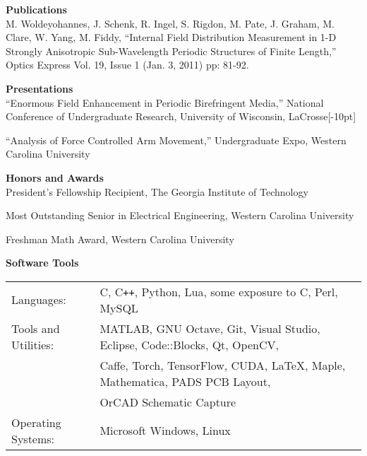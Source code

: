 \documentclass[10pt,letterpaper]{article}
\begin{document}

\bigskip
\noindent\textbf{\large{Publications}}\vspace{5.3pt}\\
\noindent
\footnotesize{M. Woldeyohannes, J. Schenk, R. Ingel, S. Rigdon, M. Pate, J. Graham, M. Clare, W. Yang, M. Fiddy, ``Internal Field Distribution Measurement in 1-D Strongly Anisotropic Sub-Wavelength Periodic Structures of Finite Length,'' Optics Express Vol. 19, Issue 1 (Jan. 3, 2011) pp: 81-92.}

\bigskip
\noindent\textbf{\large{Presentations}}\vspace{5.3pt}\\
\footnotesize{``Enormous  Field  Enhancement  in  Periodic  Birefringent Media,''
National Conference of Undergraduate Research, University of Wisconsin, LaCrosse}[-10pt]

\medskip\noindent
\footnotesize{``Analysis of Force Controlled Arm Movement,'' Undergraduate Expo, Western Carolina University}

\bigskip
\noindent\textbf{\large{Honors and Awards}}\vspace{5.3pt}\\
\noindent\footnotesize{President's Fellowship Recipient, The Georgia Institute of Technology}

\medskip
\noindent\footnotesize{Most Outstanding Senior in Electrical Engineering, Western Carolina University}

\medskip
\noindent\footnotesize{Freshman Math Award, Western Carolina University}

\bigskip
\noindent\textbf{\large{Software Tools}}

\medskip\noindent
\begin{tabular}{@{}lp{11cm}@{}}
\footnotesize{Languages:} & \footnotesize{C, C\texttt{++}, Python, Lua, some exposure to C\raisebox{2pt}{\texttt{\#}}, Perl, MySQL}\vspace{0.5mm}\\
\footnotesize{Tools and Utilities:} & \footnotesize{MATLAB, GNU Octave, Git, Visual Studio, Eclipse, Code::Blocks, Qt, OpenCV,}\\
                                    & \footnotesize{Caffe, Torch, TensorFlow, CUDA, \LaTeX, Maple, Mathematica, PADS PCB Layout,}\\
                                    & \footnotesize{OrCAD Schematic Capture}\vspace{0.5mm}\\
\footnotesize{Operating Systems:}   & \footnotesize{Microsoft Windows, Linux}\\
\end{tabular}
\end{document}
